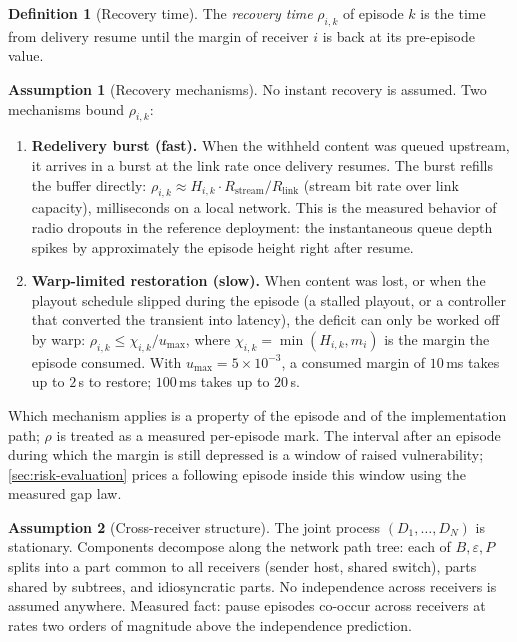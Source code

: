 \documentclass[11pt, a4paper]{article}
\theoremstyle{definition}
\newtheorem{definition}{Definition}[section]
\newtheorem{assumption}{Assumption}[section]
\theoremstyle{plain}
\theoremstyle{remark}
\begin{document}
\begin{definition}[Recovery time]\label{def:recovery}
The \emph{recovery time} $\rho_{i,k}$ of episode $k$ is the time from
delivery resume until the margin of receiver $i$ is back at its
pre-episode value.
\end{definition}

\begin{assumption}[Recovery mechanisms]\label{as:recovery}
No instant recovery is assumed.  Two mechanisms bound $\rho_{i,k}$:
\begin{enumerate}[label=(\alph*)]
  \item \textbf{Redelivery burst (fast).}  When the withheld content was
    queued upstream, it arrives in a burst at the link rate once delivery
    resumes.  The burst refills the buffer directly:
    $\rho_{i,k} \approx H_{i,k}\cdot R_{\mathrm{stream}}/R_{\mathrm{link}}$
    (stream bit rate over link capacity), milliseconds on a local
    network.  This is the measured behavior of
    radio dropouts in the reference deployment: the instantaneous queue
    depth spikes by approximately the episode height right after resume.
  \item \textbf{Warp-limited restoration (slow).}  When content was lost,
    or when the playout schedule slipped during the episode (a stalled
    playout, or a controller that converted the transient into latency),
    the deficit can only be worked off by warp:
    $\rho_{i,k} \le \chi_{i,k}/u_{\max}$, where
    $\chi_{i,k} = \min(H_{i,k}, m_i)$ is the margin the episode consumed.
    With $u_{\max} = 5\times10^{-3}$, a consumed margin of $10$\,ms takes
    up to $2$\,s to restore; $100$\,ms takes up to $20$\,s.
\end{enumerate}
Which mechanism applies is a property of the episode and of the
implementation path; $\rho$ is treated as a measured per-episode mark.
The interval after an episode during which the margin is still depressed
is a window of raised vulnerability; \cref{sec:risk-evaluation} prices a
following episode inside this window using the measured gap law.
\end{assumption}

\begin{assumption}[Cross-receiver structure]\label{as:cross}
The joint process $(D_1,\dots,D_N)$ is stationary.  Components decompose
along the network path tree: each of $B, \varepsilon, P$ splits into a
part common to all receivers (sender host, shared switch), parts shared by
subtrees, and idiosyncratic parts.  No independence across receivers is
assumed anywhere.  Measured fact: pause episodes co-occur across receivers
at rates two orders of magnitude above the independence prediction.
\end{assumption}
\end{document}
